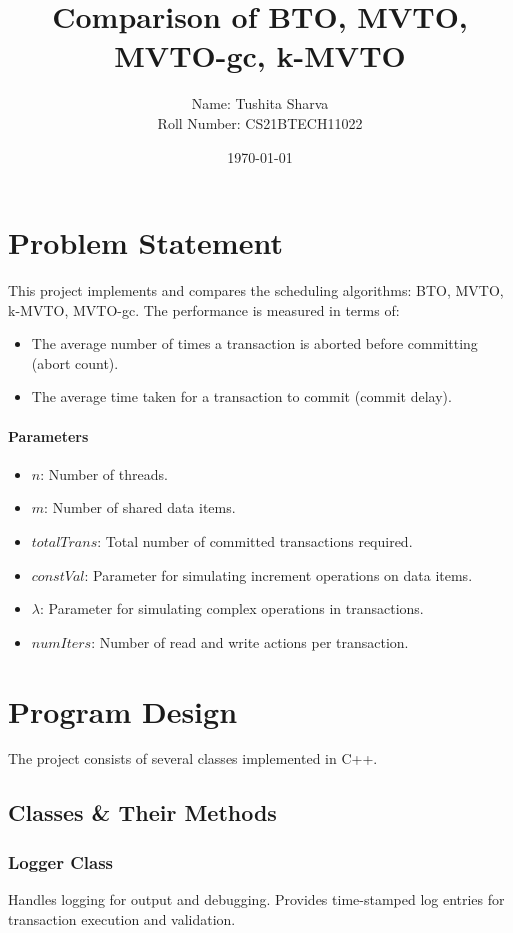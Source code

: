 \documentclass[10pt]{article}
\title{Comparison of BTO, MVTO, MVTO-gc, k-MVTO}
\author{Name: Tushita Sharva\\Roll Number: CS21BTECH11022}
\date{\today}
\begin{document}
\maketitle

\section{Problem Statement}
This project implements and compares the scheduling algorithms: BTO, MVTO, k-MVTO, MVTO-gc. The performance is measured in terms of:
\begin{itemize}
    \item The average number of times a transaction is aborted before committing (abort count).
    \item The average time taken for a transaction to commit (commit delay).
\end{itemize}

\paragraph{Parameters}
\begin{itemize}
    \item $n$: Number of threads.
    \item $m$: Number of shared data items.
    \item $totalTrans$: Total number of committed transactions required.
    \item $constVal$: Parameter for simulating increment operations on data items.
    \item \textbf{$\lambda$}: Parameter for simulating complex operations in transactions.
    \item \textbf{$numIters$}: Number of read and write actions per transaction.
\end{itemize}

\section{Program Design}
The project consists of several classes implemented in C++.

\subsection{Classes \& Their Methods}
\subsubsection{Logger Class}
Handles logging for output and debugging. Provides time-stamped log entries for transaction execution and validation.
\end{document}
